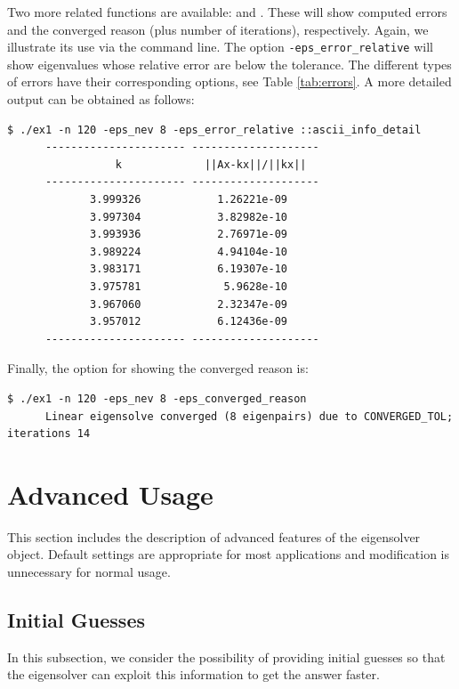 Two more related functions are available:  and . These will show computed errors and the converged reason (plus number of iterations), respectively. Again, we illustrate its use via the command line. The option \Verb!-eps_error_relative! will show eigenvalues whose relative error are below the tolerance. The different types of errors have their corresponding options, see Table \ref{tab:errors}. A more detailed output can be obtained as follows:
\begin{Verbatim}[fontsize=\footnotesize,numbers=none]
   $ ./ex1 -n 120 -eps_nev 8 -eps_error_relative ::ascii_info_detail
      ---------------------- --------------------
                 k             ||Ax-kx||/||kx||
      ---------------------- --------------------
             3.999326            1.26221e-09
             3.997304            3.82982e-10
             3.993936            2.76971e-09
             3.989224            4.94104e-10
             3.983171            6.19307e-10
             3.975781             5.9628e-10
             3.967060            2.32347e-09
             3.957012            6.12436e-09
      ---------------------- --------------------
\end{Verbatim}

Finally, the option for showing the converged reason is:
\begin{Verbatim}[fontsize=\footnotesize,numbers=none]
   $ ./ex1 -n 120 -eps_nev 8 -eps_converged_reason
      Linear eigensolve converged (8 eigenpairs) due to CONVERGED_TOL; iterations 14
\end{Verbatim}

\section{Advanced Usage}

This section includes the description of advanced features of the eigensolver object. Default settings are appropriate for most applications and modification is unnecessary for normal usage.

\subsection{Initial Guesses}

In this subsection, we consider the possibility of providing initial guesses so that the eigensolver can exploit this information to get the answer faster.

